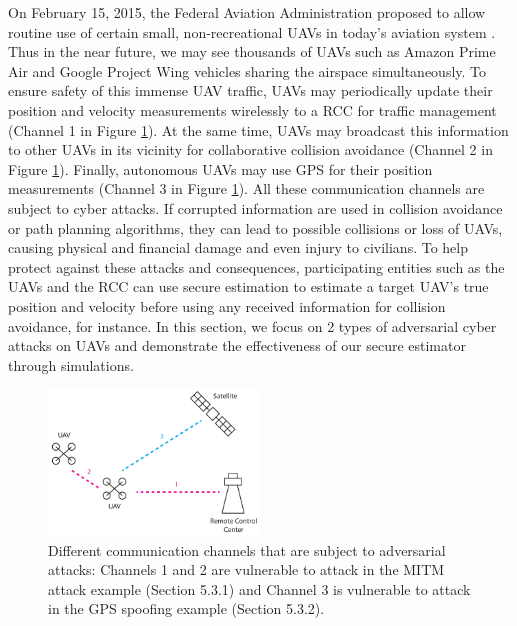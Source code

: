 \documentclass[../../thesis.tex]{subfiles}
\begin{document}
On February 15, 2015, the Federal Aviation Administration proposed to allow routine use of certain small, non-recreational UAVs in today's aviation system \cite{faa}. Thus in the near future, we may see thousands of UAVs such as Amazon Prime Air \cite{Amazon} and Google Project Wing vehicles \cite{Google} sharing the airspace simultaneously. To ensure safety of this immense UAV traffic, UAVs may periodically update their position and velocity measurements wirelessly to a RCC for traffic management (Channel 1 in Figure \ref{fig:ex_uav_pic}). At the same time, UAVs may broadcast this information to other UAVs in its vicinity for collaborative collision avoidance (Channel 2 in Figure \ref{fig:ex_uav_pic}). Finally, autonomous UAVs may use GPS for their position measurements (Channel 3 in Figure \ref{fig:ex_uav_pic}). 
All these communication channels are subject to cyber attacks. 
If corrupted information are used in collision avoidance or path planning algorithms, they can lead to possible collisions or loss of UAVs, causing physical and financial damage and even injury to civilians.
To help protect against these attacks and consequences, participating entities such as the UAVs and the RCC can use secure estimation to estimate a target UAV's true position and velocity before using any received information for collision avoidance, for instance.
In this section, we focus on 2 types of adversarial cyber attacks on UAVs and demonstrate the effectiveness of our secure estimator through simulations.
\begin{figure}
\center
\includegraphics[width=0.5\textwidth]{chapters/se_linear/figures/qh/uav_pic.pdf}
\caption{Different communication channels that are subject to adversarial attacks: Channels 1 and 2 are vulnerable to attack in the MITM attack example (Section 5.3.1) and Channel 3 is vulnerable to attack in the GPS spoofing example (Section 5.3.2).}
\label{fig:ex_uav_pic}
\end{figure}


\end{document}
